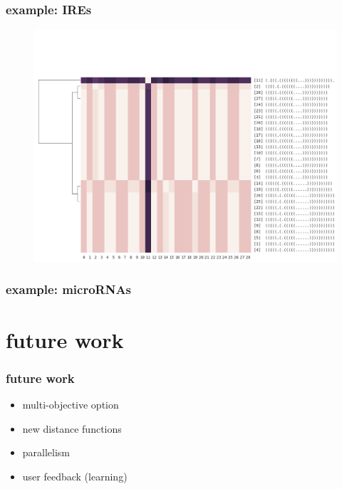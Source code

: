 \documentclass{beamer}
\begin{document}
\begin{frame}
	\frametitle{example: IREs}
	\begin{figure}
	\centering
	\includegraphics[scale=0.22]{figs/ires}
	\end{figure}
	
\end{frame}



\begin{frame}
	\frametitle{example: microRNAs}
	
\end{frame}


\section{future work}
\begin{frame}
	\frametitle{future work}
	\begin{itemize}
		\item multi-objective option
		\item new distance functions
		\item parallelism
		\item user feedback (learning)
	\end{itemize}
\end{frame}
\end{document}
